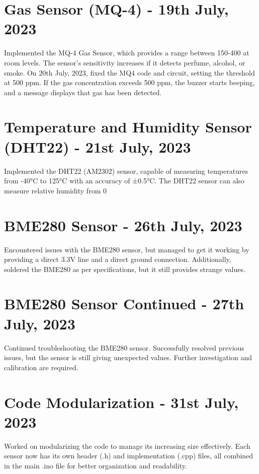 \documentclass{article}
\begin{document}
\section*{Gas Sensor (MQ-4) - 19th July, 2023}
Implemented the MQ-4 Gas Sensor, which provides a range between 150-400 at room levels. The sensor's sensitivity increases if it detects perfume, alcohol, or smoke. On 20th July, 2023, fixed the MQ4 code and circuit, setting the threshold at 500 ppm. If the gas concentration exceeds 500 ppm, the buzzer starts beeping, and a message displays that gas has been detected.

\section*{Temperature and Humidity Sensor (DHT22) - 21st July, 2023}
Implemented the DHT22 (AM2302) sensor, capable of measuring temperatures from -40°C to 125°C with an accuracy of ±0.5°C. The DHT22 sensor can also measure relative humidity from 0%

\section*{BME280 Sensor - 26th July, 2023}
Encountered issues with the BME280 sensor, but managed to get it working by providing a direct 3.3V line and a direct ground connection. Additionally, soldered the BME280 as per specifications, but it still provides strange values.

\section*{BME280 Sensor Continued - 27th July, 2023}
Continued troubleshooting the BME280 sensor. Successfully resolved previous issues, but the sensor is still giving unexpected values. Further investigation and calibration are required.

\section*{Code Modularization - 31st July, 2023}
Worked on modularizing the code to manage its increasing size effectively. Each sensor now has its own header (.h) and implementation (.cpp) files, all combined in the main .ino file for better organization and readability.
\end{document}
